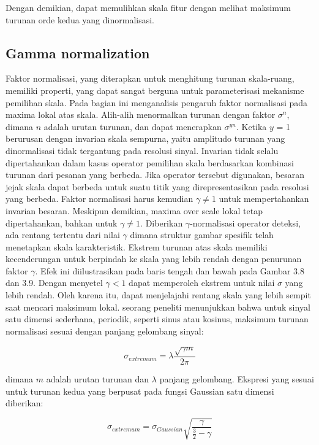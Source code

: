 Dengan demikian, dapat memulihkan skala fitur dengan melihat maksimum turunan orde kedua yang dinormalisasi.

\subsection{Gamma normalization}
Faktor normalisasi, yang diterapkan untuk menghitung turunan skala-ruang, memiliki properti, yang dapat sangat 
berguna untuk parameterisasi mekanisme pemilihan skala. Pada bagian ini menganalisis pengaruh faktor 
normalisasi pada maxima lokal atas skala. Alih-alih menormalkan turunan dengan faktor \(\sigma^{n}\), 
dimana \(n\) adalah urutan turunan, dan dapat menerapkan \(\sigma^{yn}\). Ketika \(y\) = 1 berurusan 
dengan invarian skala sempurna, yaitu amplitudo turunan yang dinormalisasi tidak tergantung pada resolusi sinyal. 
Invarian tidak selalu dipertahankan dalam kasus operator pemilihan skala berdasarkan kombinasi turunan dari pesanan yang berbeda.
Jika operator tersebut digunakan, besaran jejak skala dapat berbeda untuk suatu titik yang direpresentasikan pada resolusi yang berbeda. 
Faktor normalisasi harus kemudian \(\gamma \neq 1\) untuk mempertahankan invarian besaran. Meskipun demikian, maxima over scale lokal tetap 
dipertahankan, bahkan untuk \(\gamma \neq 1\). Diberikan \(\gamma\)-normalisasi operator deteksi, ada rentang tertentu dari nilai \(\gamma\) 
dimana struktur gambar spesifik telah menetapkan skala karakteristik.
Ekstrem turunan atas skala memiliki kecenderungan untuk berpindah ke skala yang lebih rendah dengan penurunan faktor \(\gamma\). Efek ini diilustrasikan pada baris tengah dan bawah pada Gambar 3.8 dan 3.9. Dengan menyetel \(\gamma < 1\) dapat memperoleh ekstrem untuk nilai \(\sigma\) yang lebih rendah. 
Oleh karena itu, dapat menjelajahi rentang skala yang lebih sempit saat mencari maksimum lokal. seorang peneliti menunjukkan bahwa untuk 
sinyal satu dimensi sederhana, periodik, seperti sinus atau kosinus, maksimum turunan normalisasi sesuai dengan panjang gelombang sinyal:

\begin{equation}
  \sigma_{extremum} = \lambda \frac{\sqrt{\gamma m} }{2\pi }
\end{equation}

dimana \(m\) adalah urutan turunan dan \(\lambda\) panjang gelombang. Ekspresi yang sesuai untuk turunan kedua yang berpusat pada fungsi Gaussian satu dimensi diberikan:

\begin{equation}
  \sigma_{extremum} = \sigma_{Gaussian} \sqrt{\frac{\gamma}{\frac{3}{2}- \gamma}}
\end{equation}

